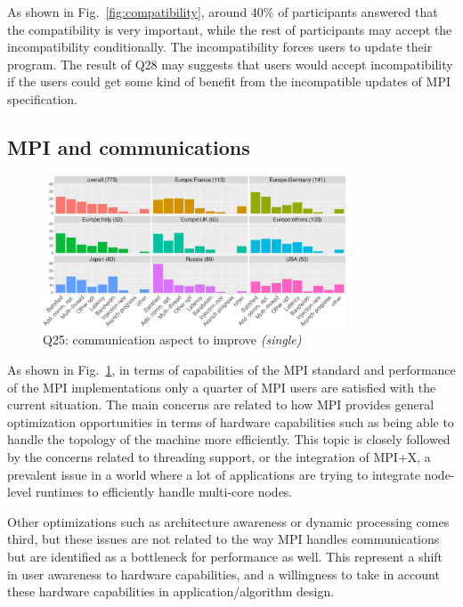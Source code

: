 \documentclass[conference,10pt,letterpaper]{IEEEtran}
\begin{document}
As shown in Fig.~\ref{fig:compatibility}, around 40\% of participants
answered that the compatibility is very important, while the rest of
participants may accept the incompatibility conditionally. The
incompatibility forces users to update their program. The result of
Q28 may suggests that users would accept incompatibility if the users
could get some kind of benefit from the incompatible updates of MPI
specification. 

\subsection{MPI and communications}

\begin{figure}[htb]
\begin{center}
\includegraphics[width=9cm]{R-scripts/Q25.pdf}
\caption{Q25: communication aspect to improve {\it(single)}}
\label{fig:com_improvment}
\end{center}
\end{figure}

As shown in Fig.~\ref{fig:com_improvment}, in terms of capabilities of
the MPI standard and performance of the MPI implementations only a
quarter of MPI users are satisfied with the current situation. The
main concerns are related to how MPI provides general optimization
opportunities in terms of hardware capabilities such as being able to
handle the topology of the machine more efficiently. This topic is
closely followed by the concerns related to threading support, or the
integration of MPI+X, a prevalent issue in a world where a lot of
applications are trying to integrate node-level runtimes to
efficiently handle multi-core nodes.

Other optimizations such as architecture awareness or dynamic processing comes
third, but these issues are not related to the way MPI handles communications
but are identified as a bottleneck for performance as well. This represent a
shift in user awareness to hardware capabilities, and a willingness to take in
account these hardware capabilities in application/algorithm design.
\end{document}
